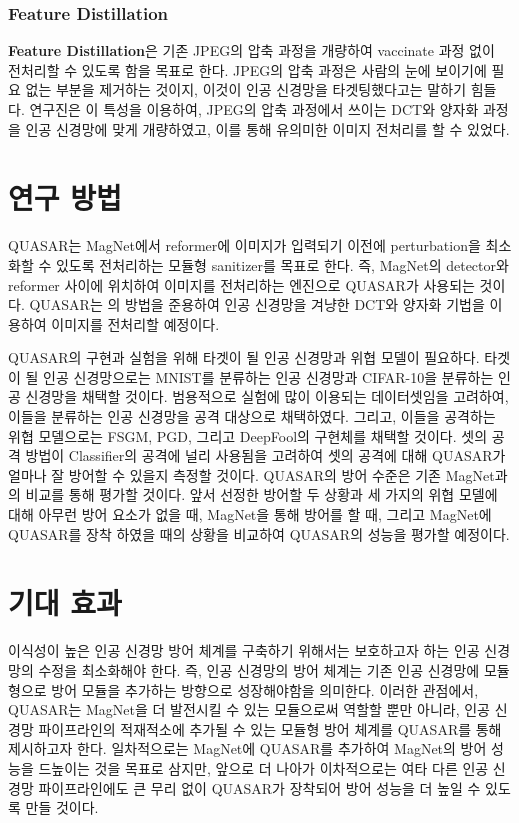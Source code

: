 \documentclass{article}
\begin{document}
\subsubsection{Feature Distillation}
\textbf{Feature Distillation}은 기존 JPEG의 압축 과정을 개량하여 vaccinate 과정 없이 전처리할 수 있도록 함을 목표로 한다.\cite{liu2019feature} JPEG의 압축 과정은 사람의 눈에 보이기에 필요 없는 부분을 제거하는 것이지, 이것이 인공 신경망을 타겟팅했다고는 말하기 힘들다. 연구진은 이 특성을 이용하여, JPEG의 압축 과정에서 쓰이는 DCT와 양자화 과정을 인공 신경망에 맞게 개량하였고, 이를 통해 유의미한 이미지 전처리를 할 수 있었다.

\section{연구 방법}

QUASAR는 MagNet에서 reformer에 이미지가 입력되기 이전에 perturbation을 최소화할 수 있도록 전처리하는 모듈형 sanitizer를 목표로 한다. 즉, MagNet의 detector와 reformer 사이에 위치하여 이미지를 전처리하는 엔진으로 QUASAR가 사용되는 것이다. QUASAR는 \cite{liu2019feature}의 방법을 준용하여 인공 신경망을 겨냥한 DCT와 양자화 기법을 이용하여 이미지를 전처리할 예정이다. 

QUASAR의 구현과 실험을 위해 타겟이 될 인공 신경망과 위협 모델이 필요하다. 타겟이 될 인공 신경망으로는 MNIST를 분류하는 인공 신경망과 CIFAR-10을 분류하는 인공 신경망을 채택할 것이다. 범용적으로 실험에 많이 이용되는 데이터셋임을 고려하여, 이들을 분류하는 인공 신경망을 공격 대상으로 채택하였다. 그리고, 이들을 공격하는 위협 모델으로는 FSGM, PGD, 그리고 DeepFool의 구현체를 채택할 것이다. 셋의 공격 방법이 Classifier의 공격에 널리 사용됨을 고려하여 셋의 공격에 대해 QUASAR가 얼마나 잘 방어할 수 있을지 측정할 것이다. QUASAR의 방어 수준은 기존 MagNet과의 비교를 통해 평가할 것이다. 앞서 선정한 방어할 두 상황과 세 가지의 위협 모델에 대해 아무런 방어 요소가 없을 때, MagNet을 통해 방어를 할 때, 그리고 MagNet에 QUASAR를 장착 하였을 때의 상황을 비교하여 QUASAR의 성능을 평가할 예정이다.

\section{기대 효과}
 
이식성이 높은 인공 신경망 방어 체계를 구축하기 위해서는 보호하고자 하는 인공 신경망의 수정을 최소화해야 한다. 즉, 인공 신경망의 방어 체계는 기존 인공 신경망에 모듈형으로 방어 모듈을 추가하는 방향으로 성장해야함을 의미한다. 이러한 관점에서, QUASAR는 MagNet을 더 발전시킬 수 있는 모듈으로써 역할할 뿐만 아니라, 인공 신경망 파이프라인의 적재적소에 추가될 수 있는 모듈형 방어 체계를 QUASAR를 통해 제시하고자 한다. 일차적으로는 MagNet에 QUASAR를 추가하여 MagNet의 방어 성능을 드높이는 것을 목표로 삼지만, 앞으로 더 나아가 이차적으로는 여타 다른 인공 신경망 파이프라인에도 큰 무리 없이 QUASAR가 장착되어 방어 성능을 더 높일 수 있도록 만들 것이다.
\end{document}
